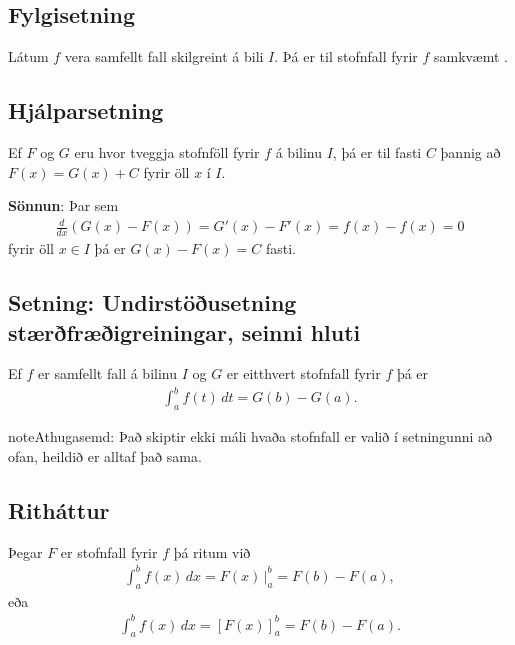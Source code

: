 \documentclass[a4paper,10pt,icelandic]{sphinxmanual}
\begin{document}
\subsection{Fylgisetning}
\label{kafli06:id8}
Látum \(f\) vera samfellt fall skilgreint á bili \(I\). Þá er
til stofnfall fyrir \(f\)
samkvæmt {\hyperref[kafli06:undirstodusetning\string-fyrri]{}}.


\subsection{Hjálparsetning}
\label{kafli06:hjalparsetning}
Ef \(F\) og \(G\) eru hvor tveggja stofnföll fyrir \(f\) á
bilinu \(I\), þá er til fasti \(C\) þannig að
\(F(x)=G(x)+C\) fyrir öll \(x\) í \(I\).

\textbf{Sönnun}: Þar sem
\begin{equation*}
\begin{split}\frac{d}{dx}(G(x) - F(x)) = G'(x) - F'(x) = f(x) - f(x) = 0\end{split}
\end{equation*}
fyrir öll \(x\in I\) þá er \(G(x)-F(x) = C\) fasti.


\subsection{Setning: Undirstöðusetning stærðfræðigreiningar, seinni hluti}
\label{kafli06:index-8}\label{kafli06:setning-undirstousetning-staerfraeigreiningar-seinni-hluti}
Ef \(f\) er samfellt fall á bilinu \(I\) og \(G\) er
eitthvert stofnfall fyrir \(f\) þá er
\begin{equation*}
\begin{split}\int_a^b f(t)\,dt=G(b)-G(a).\end{split}
\end{equation*}
\begin{notice}{note}{Athugasemd:}
Það skiptir ekki máli hvaða stofnfall er valið í setningunni að ofan,
heildið er alltaf það sama.
\end{notice}


\subsection{Ritháttur}
\label{kafli06:rithattur}
Þegar \(F\) er stofnfall fyrir \(f\) þá ritum við
\begin{equation*}
\begin{split}\int_a^b f(x)\,dx=F(x)\,\bigg|_a^b= F(b)-F(a),\end{split}
\end{equation*}
eða
\begin{equation*}
\begin{split}\int_a^b f(x)\,dx=\left[F(x)\right]_a^b= F(b)-F(a).\end{split}
\end{equation*}
\end{document}
